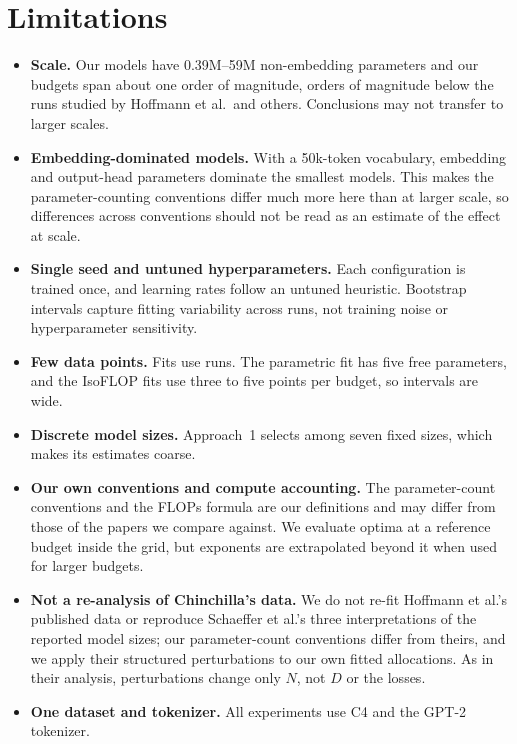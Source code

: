 \section{Limitations}
\label{sec:limitations}

\begin{itemize}
  \item \textbf{Scale.} Our models have 0.39M--59M non-embedding parameters and our budgets span about one order of magnitude, orders of magnitude below the runs studied by Hoffmann et al.\ and others. Conclusions may not transfer to larger scales.
  \item \textbf{Embedding-dominated models.} With a 50k-token vocabulary, embedding and output-head parameters dominate the smallest models. This makes the parameter-counting conventions differ much more here than at larger scale, so differences across conventions should not be read as an estimate of the effect at scale.
  \item \textbf{Single seed and untuned hyperparameters.} Each configuration is trained once, and learning rates follow an untuned heuristic. Bootstrap intervals capture fitting variability across runs, not training noise or hyperparameter sensitivity.
  \item \textbf{Few data points.} Fits use  runs. The parametric fit has five free parameters, and the IsoFLOP fits use three to five points per budget, so intervals are wide.
  \item \textbf{Discrete model sizes.} Approach~1 selects among seven fixed sizes, which makes its estimates coarse.
  \item \textbf{Our own conventions and compute accounting.} The parameter-count conventions and the FLOPs formula are our definitions and may differ from those of the papers we compare against. We evaluate optima at a reference budget inside the grid, but exponents are extrapolated beyond it when used for larger budgets.
  \item \textbf{Not a re-analysis of Chinchilla's data.} We do not re-fit Hoffmann et al.'s published data or reproduce Schaeffer et al.'s three interpretations of the reported model sizes; our parameter-count conventions differ from theirs, and we apply their structured perturbations to our own fitted allocations. As in their analysis, perturbations change only $N$, not $D$ or the losses.
  \item \textbf{One dataset and tokenizer.} All experiments use C4 and the GPT-2 tokenizer.
\end{itemize}
